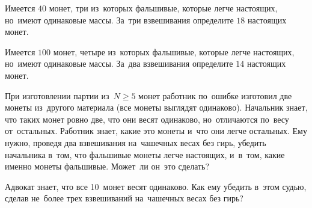 \begin{problems}
\item
Имеется $40$ монет, три из~которых фальшивые, которые легче настоящих, но~имеют
одинаковые массы.
За~три взвешивания определите $18$ настоящих монет.

\item
Имеется $100$ монет, четыре из~которых фальшивые, которые легче настоящих,
но~имеют одинаковые массы.
За~два взвешивания определите $14$ настоящих монет.

\item
При изготовлении партии из~$N \geq 5$  монет работник по~ошибке изготовил
две монеты из~другого материала (все монеты выглядят одинаково).
Начальник знает, что таких монет ровно две, что они весят одинаково,
но~отличаются по~весу от~остальных.
Работник знает, какие это монеты и~что они легче остальных.
Ему нужно, проведя два взвешивания на~чашечных весах без гирь, убедить
начальника в~том, что фальшивые монеты легче настоящих, и~в~том, какие именно
монеты фальшивые.
Может~ли он~это сделать?

\item
Адвокат знает, что все 10~монет весят одинаково.
Как ему убедить в~этом судью, сделав не~более трех взвешиваний на~чашечных
весах без гирь?

\end{problems}

